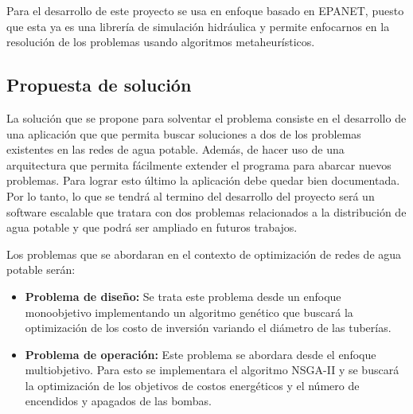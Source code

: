 \documentclass[11pt,letterpaper]{article}
\begin{document}
Para el desarrollo de este proyecto se usa en enfoque basado en EPANET, puesto que esta ya es una librería de simulación hidráulica y permite enfocarnos en la resolución de los problemas usando algoritmos metaheurísticos.

\subsection{Propuesta de solución}


La solución que se propone para solventar el problema consiste en el desarrollo de una aplicación que 
que permita buscar soluciones a dos de los problemas existentes en las redes de agua potable. Además, de hacer uso de una arquitectura que permita fácilmente extender el programa para abarcar nuevos problemas. Para lograr esto  último la aplicación debe quedar bien documentada. Por lo tanto, lo que se tendrá al termino del desarrollo del proyecto será un software escalable que tratara con dos problemas relacionados a la distribución de agua potable y que podrá ser ampliado en futuros trabajos.

Los problemas que se abordaran en el contexto de optimización de redes de agua potable serán:
\begin{itemize}
	\item \textbf{Problema de diseño:} Se trata este problema desde un enfoque monoobjetivo implementando un algoritmo genético que buscará la optimización de los costo de inversión variando el diámetro de las tuberías.  
	\item \textbf{Problema de operación:} Este problema se abordara desde el enfoque multiobjetivo. Para esto se implementara el algoritmo NSGA-II y se buscará la optimización de los objetivos de costos energéticos y el número de encendidos y apagados de las bombas.
\end{itemize}
\end{document}
